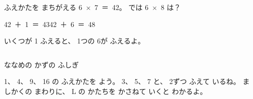 \begin{tsumazuki}{ふえかたを まちがえる}\bkqlrag
\mbox{6 × 7 ＝ 42}。 では \mbox{6 × 8} は？\par
\bkbatsu\enspace \mbox{42 ＋ 1 ＝ 43}\hspace{3\zw}\bkmaru\enspace \mbox{42 ＋ 6 ＝ 48}\par
いくつが 1 ふえると、 1つの 6が ふえるよ。
\end{tsumazuki}

\begin{column}{ななめの かずの ふしぎ}\bkqlrag
\noindent\begin{minipage}[c]{0.62\linewidth}
1、 4、 9、 16 の ふえかたを よう。 3、 5、 7 と、 2ずつ ふえて いるね。 ましかくの まわりに、 L の かたちを かさねて いくと わかるよ。
\end{minipage}\hfill
\begin{minipage}[c]{0.36\linewidth}\centering
{}
\end{minipage}
\end{column}

